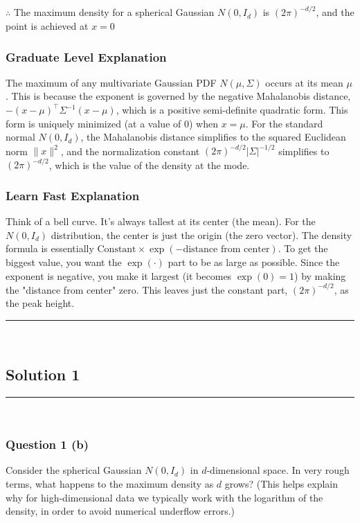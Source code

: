 \documentclass{article}
\begin{document}
\subsubsection*{\normalfont}{$\therefore$ The maximum density for a spherical Gaussian $N(0, I_d)$ is $(2\pi)^{-d/2}$, and the point is achieved at $x = 0$}

\subsubsection*{Graduate Level Explanation}
The maximum of any multivariate Gaussian PDF $N(\mu, \Sigma)$ occurs at its mean $\mu$. This is because the exponent is governed by the negative Mahalanobis distance, $-(x-\mu)^\top \Sigma^{-1} (x-\mu)$, which is a positive semi-definite quadratic form. This form is uniquely minimized (at a value of 0) when $x=\mu$. For the standard normal $N(0, I_d)$, the Mahalanobis distance simplifies to the squared Euclidean norm $\|x\|^2$, and the normalization constant $(2\pi)^{-d/2} |\Sigma|^{-1/2}$ simplifies to $(2\pi)^{-d/2}$, which is the value of the density at the mode.

\subsubsection*{Learn Fast Explanation}
Think of a bell curve. It's always tallest at its center (the mean). For the $N(0, I_d)$ distribution, the center is just the origin (the zero vector). The density formula is essentially $\text{Constant} \times \exp(-\text{distance from center})$. To get the biggest value, you want the $\exp(\cdot)$ part to be as large as possible. Since the exponent is negative, you make it largest (it becomes $\exp(0)=1$) by making the "distance from center" zero. This leaves just the constant part, $(2\pi)^{-d/2}$, as the peak height.

\noindent\rule{\textwidth}{0.4pt}\\

\newpage

\subsection*{Solution 1}
\noindent\rule{\textwidth}{0.4pt}\\
\subsubsection*{Question 1 (b)}
\begin{flushleft}
    Consider the spherical Gaussian $N(0, I_d)$ in $d$-dimensional space. 
    In very rough terms, what happens to the maximum density as $d$ grows? 
    (This helps explain why for high-dimensional data we typically work with the logarithm of the density, in order to avoid numerical underflow errors.) 
\end{flushleft}
\end{document}
